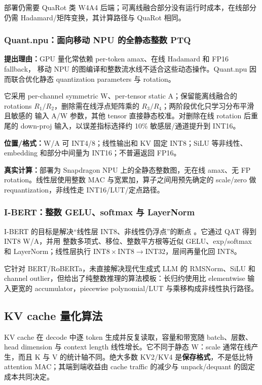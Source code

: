 部署仍需要 QuaRot 类 W4A4 后端；可离线融合部分没有运行时成本，在线部分仍需
Hadamard/矩阵变换，其计算路径与 QuaRot 相同。

\subsubsection{Quant.npu：面向移动 NPU 的全静态整数 PTQ}

\textbf{提出理由：}GPU 量化常依赖 per-token amax、在线 Hadamard 和 FP16 fallback，
移动 NPU 的图编译和整数流水线不适合这些动态操作。Quant.npu 因而联合优化静态
quantization parameters 与 rotation。

它采用 per-channel symmetric W、per-tensor static A；保留能离线融合的 rotations
$R_1/R_2$，删除需在线浮点矩阵乘的 $R_3/R_4$；两阶段优化只学习分布平滑且敏感的
输入 A/W 参数，其他 tensor 直接静态校准。对删除在线 rotation 后重尾的 down-proj
输入，以误差指标选择约 10\% 敏感层/通道提升到 INT16。

\textbf{位置/格式：}W/A 可 INT4/8；线性输出和 KV 固定 INT8；SiLU 等非线性、
embedding 和部分中间量为 INT16；不普遍返回 FP16。

\textbf{真实计算：}部署为 Snapdragon NPU 上的全静态整数图，无在线 amax、无
FP rotation。线性层使用整数 MAC 与宽累加，算子之间用预先确定的 scale/zero 做
requantization，非线性走 INT16/LUT/定点路径。

\subsubsection{I-BERT：整数 GELU、softmax 与 LayerNorm}

I-BERT 的目标是解决“线性层 INT8、非线性仍浮点”的断点
。它通过 QAT 得到 INT8 W/A，并用
整数多项式、移位、整数平方根等近似 GELU、exp/softmax 和 LayerNorm；线性层执行
$\mathrm{INT8}\times\mathrm{INT8}\rightarrow\mathrm{INT32}$，层间再量化回 INT8。

它针对 BERT/RoBERTa，未直接解决现代生成式 LLM 的 RMSNorm、SiLU 和 channel
outlier，但给出了纯整数推理的算法模板：长归约使用比 elementwise 输入更宽的
accumulator，piecewise polynomial/LUT 与乘移构成非线性执行路径。

\subsection{KV cache 量化算法}

KV cache 在 decode 中逐 token 生成并反复读取，容量和带宽随 batch、层数、head
dimension 与 context length 线性增长。它不同于静态 W：scale 通常在线产生，而且
K 与 V 的统计轴不同。绝大多数 KV2/KV4 是\textbf{保存格式}，不是低比特 attention
MAC；其端到端收益由 cache traffic 的减少与 unpack/dequant 的固定成本共同决定。


